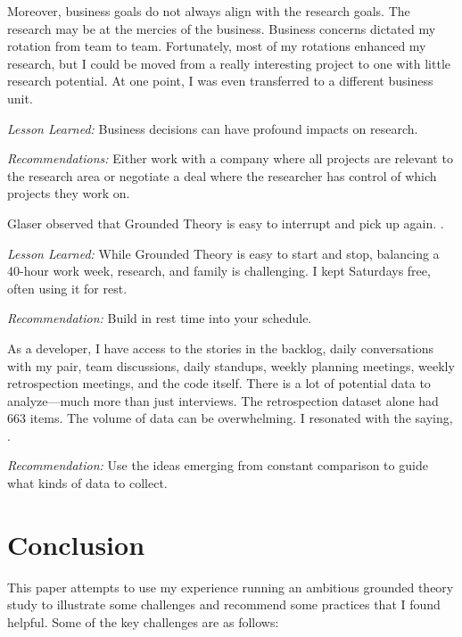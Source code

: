 Moreover, business goals do not always align with the research goals. The research may be at the mercies of the business. Business concerns dictated my rotation from team to team. Fortunately, most of my rotations enhanced my research, but I could be moved from a really interesting project to one with little research potential. At one point, I was even transferred to a different business unit. %

\textit{Lesson Learned:} Business decisions can have profound impacts on research. 

\textit{Recommendations:} Either work with a company where all projects are relevant to the research area or negotiate a deal where the researcher has control of which projects they work on.

Glaser observed that Grounded Theory is easy to interrupt and pick up again.  \cite{GlaserIssues}. 

\textit{Lesson Learned:} While Grounded Theory is easy to start and stop, balancing a 40-hour work week, research, and family is challenging. I kept Saturdays free, often using it for rest. 

\textit{Recommendation:} Build in rest time into your schedule.

As a developer, I have access to the stories in the backlog, daily conversations with my pair, team discussions, daily standups, weekly planning meetings, weekly retrospection meetings,  and the code itself. There is a lot of potential data to analyze---much more than just interviews. The retrospection dataset alone had 663 items. The volume of data can be overwhelming. I resonated with the saying,  \cite{Charmaz}. 

\textit{Recommendation:} Use the ideas emerging from constant comparison to guide what kinds of data to collect. 
\section{Conclusion}
\label{Conclusion}
This paper attempts to use my experience running an ambitious grounded theory study to illustrate some challenges and recommend some practices that I found helpful. Some of the key challenges are as follows:

